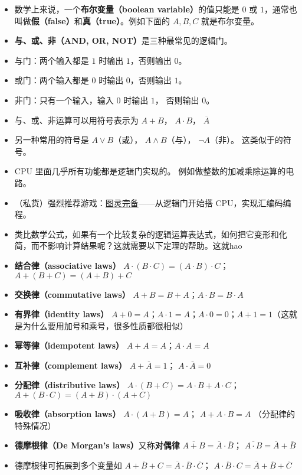 \begin{itemize}
\item 数学上来说，一个\textbf{布尔变量（boolean variable）}的值只能是 $0$ 或 $1$，通常也叫做\textbf{假（false）}和\textbf{真（true）}。例如下面的 $A,B,C$ 就是布尔变量。
\item \textbf{与、或、非（AND, OR, NOT）}是三种最常见的逻辑门。
\item 与门：两个输入都是 $1$ 时输出 $1$，否则输出 $0$。
\item 或门：两个输入都是 $0$ 时输出 $0$，否则输出 $1$。
\item 非门：只有一个输入，输入 $0$ 时输出 $1$， 否则输出 $0$。
\item 与、或、非运算可以用符号表示为 $A + B$， $A\cdot B$， $\overline A$
\item 另一种常用的符号是 $A\lor B$（或）， $A\land B$（与）， $\neg A$（非）。 这类似于的符号。
\item CPU 里面几乎所有功能都是逻辑门实现的。 例如做整数的加减乘除运算的电路。
\item （私货）强烈推荐游戏：\href{https://turingcomplete.game/}{图灵完备}——从逻辑门开始搭 CPU，实现汇编码编程。
\item 类比数学公式，如果有一个比较复杂的逻辑运算表达式，如何把它变形和化简，而不影响计算结果呢？这就需要以下定理的帮助。这就hao
\item \textbf{结合律（associative laws）} $A\cdot(B\cdot C) = (A\cdot B)\cdot C$； $A+(B+C)=(A+B)+C$
\item \textbf{交换律（commutative laws）} $A+B=B+A$；$A\cdot B=B\cdot A$
\item \textbf{有界律（identity laws）} $A+0=A$；$A\cdot 1=A$；$A\cdot 0 = 0$；$A+1=1$（这就是为什么要用加号和乘号，很多性质都很相似）
\item \textbf{幂等律（idempotent laws）} $A+A=A$；$A\cdot A=A$
\item \textbf{互补律（complement laws）} $A+\overline A = 1$； $A\cdot \overline A = 0$
\item \textbf{分配律（distributive laws）} $A\cdot(B+C)=A\cdot B+A\cdot C$； $A+(B\cdot C) = (A+B)\cdot(A+C)$
\item \textbf{吸收律（absorption laws）} $A\cdot(A+B) = A$； $A+A\cdot B = A$ （分配律的特殊情况）
\item \textbf{德摩根律（De Morgan's laws）}又称\textbf{对偶律} $\overline{A+B} = \overline A \cdot \overline B$； $\overline{A \cdot B} = \overline A + \overline B$
\item 德摩根律可拓展到多个变量如 $\overline{A+B+C} = \overline A \cdot \overline B \cdot \overline C$； $\overline{A \cdot B\cdot C} = \overline A + \overline B + \overline C$

\end{itemize}
